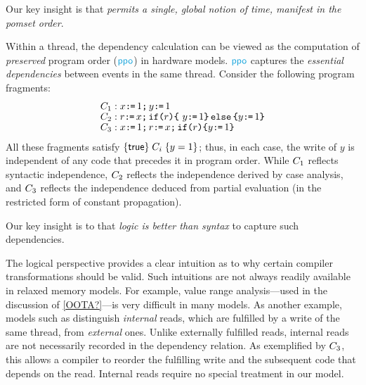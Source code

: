 Our key insight is that \emph{\mca{} permits a single, global notion of time,
  manifest in the pomset order}.
  

Within a thread, the dependency calculation can be viewed as the computation
of \emph{preserved} program order ($\rppo$) in hardware models.  $\rppo$
captures the \emph{essential dependencies} between events in the same thread.
Consider the following program fragments: \begingroup \allowdisplaybreaks
\begin{align*}
  & C_1: x \texttt{:}\mkern-1mu\texttt{=}\, 1 \texttt{;}\,\allowbreak y \texttt{:}\mkern-1mu\texttt{=}\, 1
  \\[-1ex] & C_2: r \texttt{:}\mkern-1mu\texttt{=}\, x \texttt{;}\,\allowbreak \texttt{if}\allowbreak\texttt{(}r\texttt{)} \allowbreak\texttt{\{}\ y \texttt{:}\mkern-1mu\texttt{=}\, 1 \texttt{\}}\,\allowbreak\texttt{else}\allowbreak\,\texttt{\{} y \texttt{:}\mkern-1mu\texttt{=}\, 1  \texttt{\}}
  \\[-1ex] & C_3: x \texttt{:}\mkern-1mu\texttt{=}\, 1 \texttt{;}\,\allowbreak r \texttt{:}\mkern-1mu\texttt{=}\, x \texttt{;}\,\allowbreak \texttt{if}\allowbreak\texttt{(}r\texttt{)} \allowbreak\texttt{\{} y \texttt{:}\mkern-1mu\texttt{=}\, 1 \texttt{\}}
\end{align*}
\endgroup
All these fragments satisfy $\{\mathsf{true}\}\allowbreak\;C_i\;\allowbreak\{y =1\}$; thus, in each
case, the write of $y$ is independent of any code that precedes it in program
order. While $C_1$ reflects syntactic independence, $C_2$ reflects
the independence derived by case analysis, and $C_3$ reflects the
independence deduced from partial evaluation (in the restricted form of
constant propagation).

Our key insight is to that \emph{logic is better than syntax} to capture such
dependencies.

The logical perspective provides a clear intuition as to why certain compiler
transformations should be valid.  Such intuitions are not always readily
available in relaxed memory models.  For example, value range analysis---used
in the discussion of \eqref{OOTA?}---is very difficult in many models.  As
another example, models such as \armeight{} distinguish \emph{internal}
reads, which are fulfilled by a write of the same thread, from
\emph{external} ones.  Unlike externally fulfilled reads, internal reads are
not necessarily recorded in the dependency relation.  As exemplified by
$C_3$, this allows a compiler to reorder the fulfilling write and the
subsequent code that depends on the read.  Internal reads require no special
treatment in our model.





